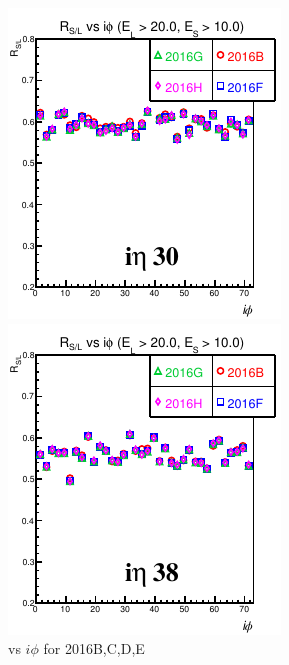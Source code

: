 \begin{figure}[!h] %
\begin{minipage}[c]{0.5\linewidth}
\centering
\includegraphics[width=0.7\linewidth]{../Figures/Chap2/ImageFiles_HF/Ratio/2016/ieta30For2016BFGH.pdf}
\end{minipage}
\begin{minipage}[c]{0.5\linewidth}
\centering
\includegraphics[width=0.7\linewidth]{../Figures/Chap2/ImageFiles_HF/Ratio/2016/ieta38For2016BFGH.pdf}
\end{minipage}
\caption{\ratiosl vs $i\phi$ for 2016B,C,D,E}
\label{RvsIphiFor2016BFGH}
\end{figure}

